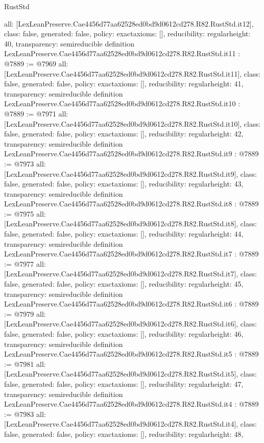 \begin{lexlean}{RustStd}
\begin{coremodule}
{  all: [LexLeanPreserve.Cae4456d77aa62528ed0bd9d0612cd278.R82.RustStd.it12],
  class: false,
  generated: false,
  policy: exact{axioms: []},
  reducibility: regular{height: 40},
  transparency: semireducible
}
definition LexLeanPreserve.Cae4456d77aa62528ed0bd9d0612cd278.R82.RustStd.it11 : @7889 := @7969 {
  all: [LexLeanPreserve.Cae4456d77aa62528ed0bd9d0612cd278.R82.RustStd.it11],
  class: false,
  generated: false,
  policy: exact{axioms: []},
  reducibility: regular{height: 41},
  transparency: semireducible
}
definition LexLeanPreserve.Cae4456d77aa62528ed0bd9d0612cd278.R82.RustStd.it10 : @7889 := @7971 {
  all: [LexLeanPreserve.Cae4456d77aa62528ed0bd9d0612cd278.R82.RustStd.it10],
  class: false,
  generated: false,
  policy: exact{axioms: []},
  reducibility: regular{height: 42},
  transparency: semireducible
}
definition LexLeanPreserve.Cae4456d77aa62528ed0bd9d0612cd278.R82.RustStd.it9 : @7889 := @7973 {
  all: [LexLeanPreserve.Cae4456d77aa62528ed0bd9d0612cd278.R82.RustStd.it9],
  class: false,
  generated: false,
  policy: exact{axioms: []},
  reducibility: regular{height: 43},
  transparency: semireducible
}
definition LexLeanPreserve.Cae4456d77aa62528ed0bd9d0612cd278.R82.RustStd.it8 : @7889 := @7975 {
  all: [LexLeanPreserve.Cae4456d77aa62528ed0bd9d0612cd278.R82.RustStd.it8],
  class: false,
  generated: false,
  policy: exact{axioms: []},
  reducibility: regular{height: 44},
  transparency: semireducible
}
definition LexLeanPreserve.Cae4456d77aa62528ed0bd9d0612cd278.R82.RustStd.it7 : @7889 := @7977 {
  all: [LexLeanPreserve.Cae4456d77aa62528ed0bd9d0612cd278.R82.RustStd.it7],
  class: false,
  generated: false,
  policy: exact{axioms: []},
  reducibility: regular{height: 45},
  transparency: semireducible
}
definition LexLeanPreserve.Cae4456d77aa62528ed0bd9d0612cd278.R82.RustStd.it6 : @7889 := @7979 {
  all: [LexLeanPreserve.Cae4456d77aa62528ed0bd9d0612cd278.R82.RustStd.it6],
  class: false,
  generated: false,
  policy: exact{axioms: []},
  reducibility: regular{height: 46},
  transparency: semireducible
}
definition LexLeanPreserve.Cae4456d77aa62528ed0bd9d0612cd278.R82.RustStd.it5 : @7889 := @7981 {
  all: [LexLeanPreserve.Cae4456d77aa62528ed0bd9d0612cd278.R82.RustStd.it5],
  class: false,
  generated: false,
  policy: exact{axioms: []},
  reducibility: regular{height: 47},
  transparency: semireducible
}
definition LexLeanPreserve.Cae4456d77aa62528ed0bd9d0612cd278.R82.RustStd.it4 : @7889 := @7983 {
  all: [LexLeanPreserve.Cae4456d77aa62528ed0bd9d0612cd278.R82.RustStd.it4],
  class: false,
  generated: false,
  policy: exact{axioms: []},
  reducibility: regular{height: 48},
}
\end{coremodule}
\end{lexlean}
